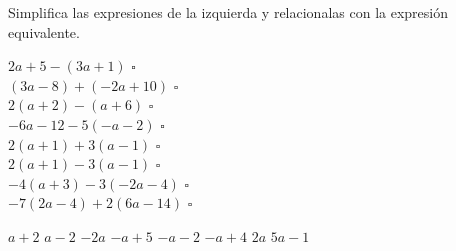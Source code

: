 \question[10] Simplifica las expresiones de la izquierda y relacionalas con la expresión equivalente.
\begin{multicols}{2}
    \begin{flushright}
        $2a+5 - (3a+1)$ $\square$\\       \vspace{0.5cm}
        $(3a-8)+(-2a+10)$ $\square$\\       \vspace{0.5cm}
        $2(a+2)-(a+6)$ $\square$\\       \vspace{0.5cm}
        $-6a-12-5(-a-2)$ $\square$\\       \vspace{0.5cm}
        $2(a+1)+3(a-1)$ $\square$\\       \vspace{0.5cm}
        $2(a+1)-3(a-1)$ $\square$\\       \vspace{0.5cm}
        $-4(a+3)-3(-2a-4)$ $\square$\\       \vspace{0.5cm}
        $-7(2a-4)+2(6a-14)$ $\square$\\       \vspace{0.5cm}
    \end{flushright}
    \vspace{1cm}
    \begin{checkboxes}
        \choice $a+2$
        \choice $a-2$
        \choice $-2a$
        \choice $-a+5$
        \choice $-a-2$
        \choice $-a+4$
        \choice $2a$
        \choice $5a-1$
    \end{checkboxes}
\end{multicols}
